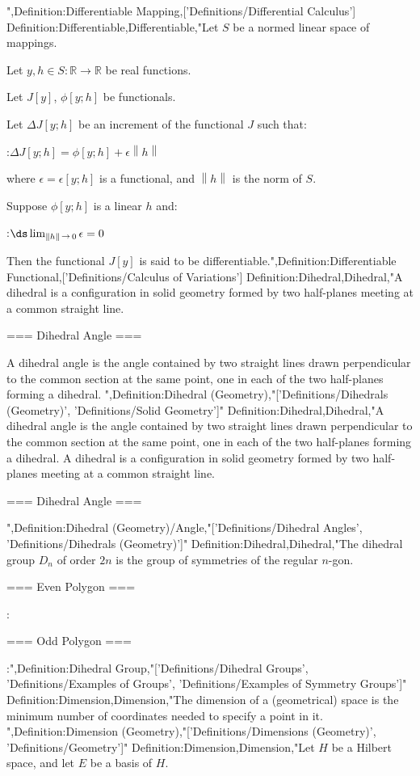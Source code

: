 ",Definition:Differentiable Mapping,['Definitions/Differential Calculus']
Definition:Differentiable,Differentiable,"Let $S$ be a normed linear space of mappings.

Let $y, h \in S: \mathbb R \to \mathbb R$ be real functions.

Let $J \left[ y \right]$, $\phi \left[ y; h \right]$ be functionals.

Let $\Delta J \left[ y; h \right]$ be an increment of the functional $J$ such that:

:$\Delta J \left[ y; h \right] = \phi \left[ y;h \right] + \epsilon \left\lVert h \right\rVert$

where $\epsilon = \epsilon \left[ y; h \right]$ is a functional, and $\left\lVert h \right\rVert$ is the norm of $S$.

Suppose $\phi \left[ y; h \right]$ is a linear  $h$ and:

:$\ds \lim_{\left\lVert h \right\rVert \mathop \to 0} \epsilon = 0$


Then the functional $J \left[ y \right] $ is said to be differentiable.",Definition:Differentiable Functional,['Definitions/Calculus of Variations']
Definition:Dihedral,Dihedral,"A dihedral is a configuration in solid geometry formed by two half-planes meeting at a common straight line.


=== Dihedral Angle ===

A dihedral angle is the angle contained by two straight lines drawn perpendicular to the common section at the same point, one in each of the two half-planes forming a dihedral.
",Definition:Dihedral (Geometry),"['Definitions/Dihedrals (Geometry)', 'Definitions/Solid Geometry']"
Definition:Dihedral,Dihedral,"A dihedral angle is the angle contained by two straight lines drawn perpendicular to the common section at the same point, one in each of the two half-planes forming a dihedral.
A dihedral is a configuration in solid geometry formed by two half-planes meeting at a common straight line.


=== Dihedral Angle ===

",Definition:Dihedral (Geometry)/Angle,"['Definitions/Dihedral Angles', 'Definitions/Dihedrals (Geometry)']"
Definition:Dihedral,Dihedral,"The dihedral group $D_n$ of order $2 n$ is the group of symmetries of the regular $n$-gon.


=== Even Polygon ===


:

=== Odd Polygon ===


:",Definition:Dihedral Group,"['Definitions/Dihedral Groups', 'Definitions/Examples of Groups', 'Definitions/Examples of Symmetry Groups']"
Definition:Dimension,Dimension,"The dimension of a (geometrical) space is the minimum number of coordinates needed to specify a point in it.
",Definition:Dimension (Geometry),"['Definitions/Dimensions (Geometry)', 'Definitions/Geometry']"
Definition:Dimension,Dimension,"Let $H$ be a Hilbert space, and let $E$ be a basis of $H$.


